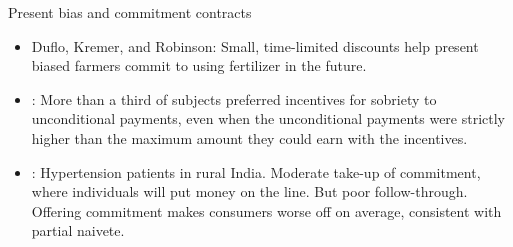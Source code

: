 \documentclass[aspectratio=169, 10pt, handout]{beamer}
\begin{document}
\begin{frame}{Present bias and commitment contracts}
{\begin{itemize}
        \item \cite{duflo2008high} Duflo, Kremer, and Robinson: Small, time-limited discounts help present biased farmers commit to using fertilizer in the future.

        \item \cite{schilbach2015alcohol}: More than a third of subjects preferred incentives for sobriety to unconditional payments, even when the unconditional payments were strictly higher than the maximum amount they could earn with the incentives.

        \item \cite{bai2017self}: Hypertension patients in rural India. Moderate take-up of commitment, where individuals will put money on the line. But poor follow-through. Offering commitment makes consumers worse off on average, consistent with partial naivete. 

    \end{itemize}
}

\end{frame}
\end{document}
